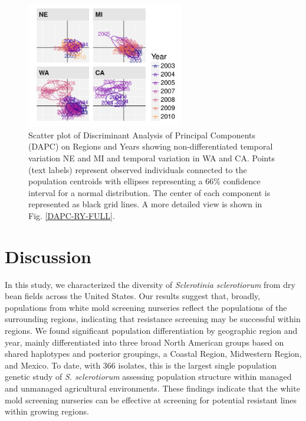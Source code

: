 \begin{figure}
\centering
\includegraphics[width=0.61000\textwidth]{../../results/figures/publication/Fig6.pdf}
\caption{Scatter plot of Discriminant Analysis of Principal Components
(DAPC) on Regions and Years showing non-differentiated temporal
variation NE and MI and temporal variation in WA and CA. Points (text
labels) represent observed individuals connected to the population
centroids with ellipses representing a 66\% confidence interval for a
normal distribution. The center of each component is represented as
black grid lines. A more detailed view is shown in Fig.
\ref{DAPC-RY-FULL}.}\label{DAPC-RY}
\end{figure}

\section*{Discussion}\label{discussion}

In this study, we characterized the diversity of \emph{Sclerotinia
sclerotiorum} from dry bean fields across the United States. Our results
suggest that, broadly, populations from white mold screening nurseries
reflect the populations of the surrounding regions, indicating that
resistance screening may be successful within regions. We found
significant population differentiation by geographic region and year,
mainly differentiated into three broad North American groups based on
shared haplotypes and posterior groupings, a Coastal Region, Midwestern
Region, and Mexico. To date, with 366 isolates, this is the largest
single population genetic study of \emph{S. sclerotiorum} assessing
population structure within managed and unmanaged agricultural
environments. These findings indicate that the white mold screening
nurseries can be effective at screening for potential resistant lines
within growing regions.

